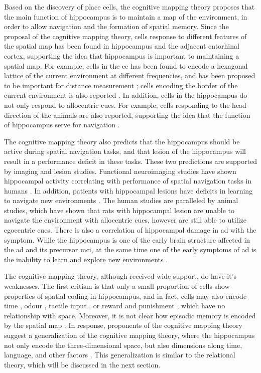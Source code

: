 Based on the discovery of place cells, the cognitive mapping theory proposes that the main function of hippocampus is to maintain a map of the environment, in order to allow navigation and the formation of spatial memory. Since the proposal of the cognitive mapping theory, cells response to different features of the spatial map has been found in hippocampus and the adjacent entorhinal cortex, supporting the idea that hippocampus is important to maintaining a spatial map. For example, cells in the \gls{ec} has been found to encode a hexagonal lattice of the current environment at different frequencies, and has been proposed to be important for distance measurement \citep{fyhn04, hafting05, moser15}; cells encoding the border of the current environment is also reported \citep{solstad08}. In addition, cells in the hippocampus do not only respond to allocentric cues. For example, cells responding to the head direction of the animals are also reported, supporting the idea that the function of hippocampus serve for navigation \citep{sargolini06}. 

The cognitive mapping theory also predicts that the hippocampus should be active during spatial navigation tasks, and that lesion of the hippocampus will result in a performance deficit in these tasks. These two predictions are supported by imaging and lesion studies. Functional neuroimaging studies have shown hippocampal activity correlating with performance of spatial navigation tasks in humans \citep{burgess02, hartley07}. In addition, patients with hippocampal lesions have deficits in learning to navigate new environments \citep{hartley07}. The human studies are paralleled by animal studies, which have shown that rats with hippocampal lesion are unable to navigate the environment with allocentric cues, however are still able to utilize egocentric cues\citep{morris06}. There is also a correlation of hippocampal damage in \gls{ad} with the symptom. While the hippocampus is one of the early brain structure affected in the \gls{ad} and its precursor \gls{mci}, at the same time one of the early symptoms of \gls{ad} is the inability to learn and explore new environments \citep{vlcek14}.

The cognitive mapping theory, although received wide support, do have it's weaknesses. The first critism is that only a small proportion of cells show properties of spatial coding in hippocampus, and in fact, cells may also encode time \citep{hampson93}, odour \citep{wood99}, tactile input \citep{young94}, or reward and punishment \citep{moser08}, which have no relationship with space. Moreover, it is not clear how episodic memory is encoded by the spatial map \citep{konkel09}. In response, proponents of the cognitive mapping theory suggest a generalization of the cognitive mapping theory, where the hippocampus not only encode the three-dimensional space, but also dimensions along time, language, and other factors \citep{burgess02}. This generalization is similar to the relational theory, which will be discussed in the next section.

